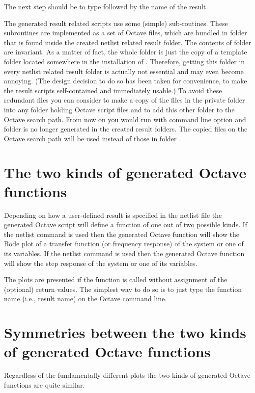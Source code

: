The next step should be to type  followed by the name of the
result.

The generated result related scripts use some (simple) sub-routines. These
subroutines are implemented as a set of Octave files, which are bundled in
folder  that is found inside the created netlist related
result folder. The contents of folder  are invariant. As a
matter of fact, the whole folder is just the copy of a template folder
located somewhere in the installation of \linnet{}. Therefore, getting
this folder in every netlist related result folder is actually not
essential and may even become annoying. (The design decision to do so has
been taken for convenience, to make the result scripts self-contained and
immediately usable.) To avoid these redundant files you can consider to
make a copy of the files in the private folder into any folder holding
Octave script files and to add this other folder to the Octave search
path. From now on you would run \linnet{} with command line option
 and folder  is no longer generated in the created
result folders. The copied files on the Octave search path will be used
instead of those in folder .


\section{The two kinds of generated Octave functions}

Depending on how a user-defined result is specified in the netlist file
the generated Octave script will define a function of one out of two
possible kinds. If the netlist command  is used then the
generated Octave function will show the Bode plot of a transfer function (or
frequency response) of the system or one of its variables. If the netlist
command  is used then the generated Octave function will show
the step response of the system or one of its variables.

The plots are presented if the function is called without assignment of
the (optional) return values. The simplest way to do so is to just type
the function name (i.e., result name) on the Octave command line.


\section{Symmetries between the two kinds of generated Octave functions}

Regardless of the fundamentally different plots the two kinds of generated
Octave functions are quite similar.

